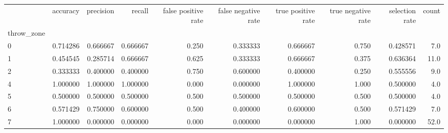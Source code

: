 \begin{tabular}{lrrrrrrrrr}
\toprule
{} &  accuracy &  precision &    recall &  false positive rate &  false negative rate &  true positive rate &  true negative rate &  selection rate &  count \\
throw\_zone &           &            &           &                      &                      &                     &                     &                 &        \\
\midrule
0          &  0.714286 &   0.666667 &  0.666667 &                0.250 &             0.333333 &            0.666667 &               0.750 &        0.428571 &    7.0 \\
1          &  0.454545 &   0.285714 &  0.666667 &                0.625 &             0.333333 &            0.666667 &               0.375 &        0.636364 &   11.0 \\
2          &  0.333333 &   0.400000 &  0.400000 &                0.750 &             0.600000 &            0.400000 &               0.250 &        0.555556 &    9.0 \\
4          &  1.000000 &   1.000000 &  1.000000 &                0.000 &             0.000000 &            1.000000 &               1.000 &        0.500000 &    4.0 \\
5          &  0.500000 &   0.500000 &  0.500000 &                0.500 &             0.500000 &            0.500000 &               0.500 &        0.500000 &    4.0 \\
6          &  0.571429 &   0.750000 &  0.600000 &                0.500 &             0.400000 &            0.600000 &               0.500 &        0.571429 &    7.0 \\
7          &  1.000000 &   0.000000 &  0.000000 &                0.000 &             0.000000 &            0.000000 &               1.000 &        0.000000 &   52.0 \\
\bottomrule
\end{tabular}
